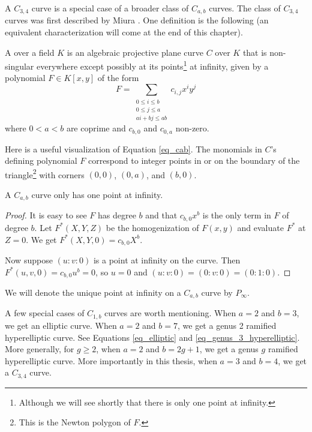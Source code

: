 A $C_{3,4}$ curve is a special case of a broader class of $C_{a,b}$ curves.
The class of $C_{3,4}$ curves was first described by Miura \cite{miura97}.
One definition is the following (an equivalent characterization will come at the end of this chapter).

\begin{definition}
  \label{def_cab_curve}
  A  over a field $K$
  is an algebraic projective plane curve $C$ over $K$
  that is non-singular everywhere except possibly at its points\footnote{
Although we will see shortly that there is only one point at infinity.}
  at infinity, given by a polynomial $F \in K[x,y]$ of the form
  \begin{equation}
    \label{eq_cab}
    F = \sum_{\substack{0 \leq i \leq b \\ 0 \leq j \leq a \\ ai + bj \leq ab }}c_{i,j}x^iy^j
  \end{equation}
  where $0 < a < b$ are coprime and $c_{b,0}$ and $c_{0,a}$ non-zero.
\end{definition}
Here is a useful visualization of Equation \ref{eq_cab}.
The monomials in $C$'s defining polynomial $F$ correspond to integer points
in or on the boundary of the triangle\footnote{
This is the Newton polygon of $F$.}
with corners $(0, 0)$, $(0, a)$, and $(b, 0)$.

\begin{proposition}
  A $C_{a,b}$ curve only has one point at infinity.
\end{proposition}
\begin{proof}
  It is easy to see $F$ has degree $b$
  and that $c_{b,0}x^b$ is the only term in $F$ of degree $b$.
  Let $F^*(X,Y,Z)$ be the homogenization of $F(x,y)$ and evaluate $F^*$ at $Z = 0$.
  We get $F^*(X,Y,0) = c_{b,0}X^b$.
  
  Now suppose $(u:v:0)$ is a point at infinity on the curve.
  Then $F^*(u,v,0) = c_{b,0}u^b = 0$, so $u = 0$ and $(u : v : 0) = (0 : v : 0) = (0 : 1 : 0)$.
\end{proof}
We will denote the unique point at infinity on a $C_{a,b}$ curve by $P_{\infty}$.

A few special cases of $C_{1,b}$ curves are worth mentioning.
When $a = 2$ and $b = 3$, we get an elliptic curve.
When $a = 2$ and $b = 7$, we get a genus 2 ramified hyperelliptic curve.
See Equations \ref{eq_elliptic} and \ref{eq_genus_3_hyperelliptic}.
More generally, for $g \geq 2$, when $a = 2$ and $b = 2g + 1$, we get a genus $g$ ramified hyperelliptic curve.
More importantly in this thesis,
when $a = 3$ and $b = 4$, we get a $C_{3,4}$ curve.

